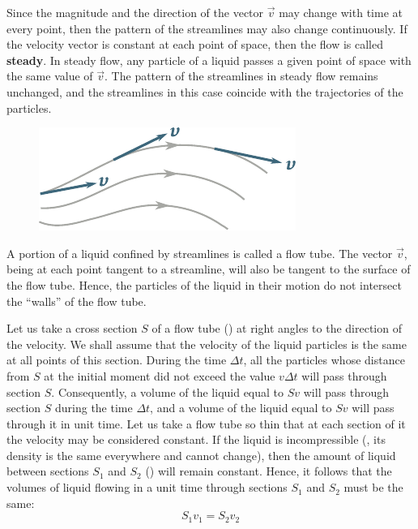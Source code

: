 Since the magnitude and the direction of the vector $\vec{v}$ may change with time at every point, then the pattern of the streamlines may also change continuously. If the velocity vector is constant at each point of space, then the flow is called \textbf{steady}. In steady flow, any particle of a liquid passes a given point of space with the same value of $\vec{v}$. The pattern of the streamlines in steady flow remains unchanged, and the streamlines in this case coincide with the trajectories of the particles.

\begin{figure}[t]
	\begin{center}
		\includegraphics[scale=1.0]{figures/ch_09/fig_9_1.pdf}
		\caption[]{}
		\label{fig:9_1}
	\end{center}
	\vspace{-0.8cm}
\end{figure}

A portion of a liquid confined by streamlines is called a flow tube. The vector $\vec{v}$, being at each point tangent to a streamline, will also be tangent to the surface of the flow tube. Hence, the particles of the liquid in their motion do not intersect the ``walls'' of the flow tube.

Let us take a cross section $S$ of a flow tube () at right angles to the direction of the velocity. We shall assume that the velocity of the liquid particles is the same at all points of this section. During the time $\Delta t$, all the particles whose distance from $S$ at the initial moment did not exceed the value $v\Delta t$ will pass through section $S$. Consequently, a volume of the liquid equal to $Sv$ will pass through section $S$ during the time $\Delta t$, and a volume of the liquid equal to $Sv$ will pass through it in unit time. Let us take a flow tube so thin that at each section of it the velocity may be considered constant. If the liquid is incompressible (\ie, its density is the same everywhere and cannot change), then the amount of liquid between sections $S_1$ and $S_2$ () will remain constant. Hence, it follows that the volumes of liquid flowing in a unit time through sections $S_1$ and $S_2$ must be the same:
\begin{equation*}
	S_1v_1 =S_2v_2
\end{equation*}

